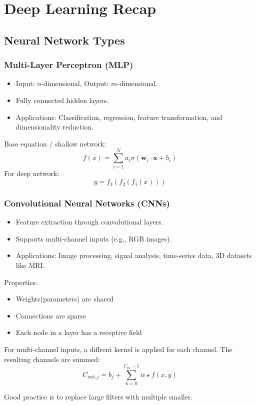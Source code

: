 \section{Deep Learning Recap}

\subsection{Neural Network Types}
\subsubsection{Multi-Layer Perceptron (MLP)}
\begin{itemize}
    \item Input: \( n \)-dimensional, Output: \( m \)-dimensional.
    \item Fully connected hidden layers.
    \item Applications: Classification, regression, feature transformation, and dimensionality reduction.
\end{itemize}
Base equation / shallow network:
\[
f(x) = \sum_{i = 1}^{N} a_i \sigma(\mathbf{w}_i\cdot\mathbf{x} + b_i)
\]
For deep network:
\[
    y = f_3(f_2(f_1(x)))
\]

\subsubsection{Convolutional Neural Networks (CNNs)}
\begin{itemize}
    \item Feature extraction through convolutional layers.
    \item Supports multi-channel inputs (e.g., RGB images).
    \item Applications: Image processing, signal analysis, time-series data, 3D datasets like MRI.
\end{itemize}
Properties:
\begin{itemize}
    \item Weights(parameters) are shared
    \item Connections are sparse
    \item Each node in a layer has a receptive field
\end{itemize}
For multi-channel inputs, a diffrent kernel is applied for each channel.
The resulting channels are summed:
\[
C_{out,j} = b_j + \sum_{k=0}^{C_{in}-1} w \star f(x,y)
\]

Good practiec is to replace large filters with multiple smaller.

